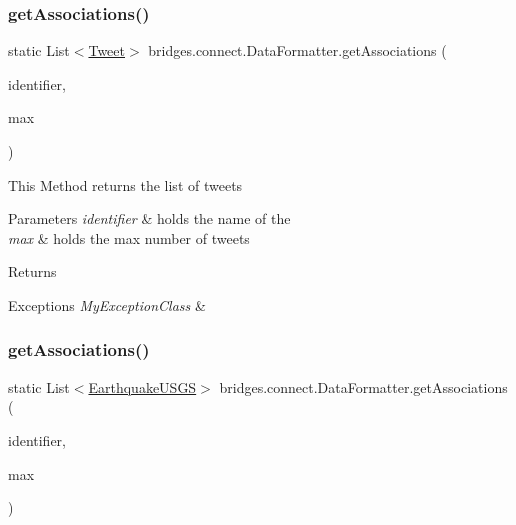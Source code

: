 \subsubsection{\texorpdfstring{get\+Associations()}{getAssociations()}\hspace{0.1cm}{\footnotesize\ttfamily [2/5]}}
{\footnotesize\ttfamily static List$<$\hyperlink{classbridges_1_1data__src__dependent_1_1_tweet}{Tweet}$>$ bridges.\+connect.\+Data\+Formatter.\+get\+Associations (\begin{DoxyParamCaption}\item[{\hyperlink{classbridges_1_1data__src__dependent_1_1_twitter_account}{Twitter\+Account}}]{identifier,  }\item[{int}]{max }\end{DoxyParamCaption})\hspace{0.3cm}{\ttfamily [static]}}

This Method returns the list of tweets 
\begin{DoxyParams}{Parameters}
{\em identifier} & holds the name of the \\
\hline
{\em max} & holds the max number of tweets \\
\hline
\end{DoxyParams}
\begin{DoxyReturn}{Returns}

\end{DoxyReturn}

\begin{DoxyExceptions}{Exceptions}
{\em My\+Exception\+Class} & \\
\hline
\end{DoxyExceptions}
\hypertarget{classbridges_1_1connect_1_1_data_formatter_abdcbc3c914dc045cb532fae291d4f3a5}{}\label{classbridges_1_1connect_1_1_data_formatter_abdcbc3c914dc045cb532fae291d4f3a5} 
\subsubsection{\texorpdfstring{get\+Associations()}{getAssociations()}\hspace{0.1cm}{\footnotesize\ttfamily [3/5]}}
{\footnotesize\ttfamily static List$<$\hyperlink{classbridges_1_1data__src__dependent_1_1_earthquake_u_s_g_s}{Earthquake\+U\+S\+GS}$>$ bridges.\+connect.\+Data\+Formatter.\+get\+Associations (\begin{DoxyParamCaption}\item[{\hyperlink{classbridges_1_1data__src__dependent_1_1_u_s_g_saccount}{U\+S\+G\+Saccount}}]{identifier,  }\item[{int}]{max }\end{DoxyParamCaption})\hspace{0.3cm}{\ttfamily [static]}}

